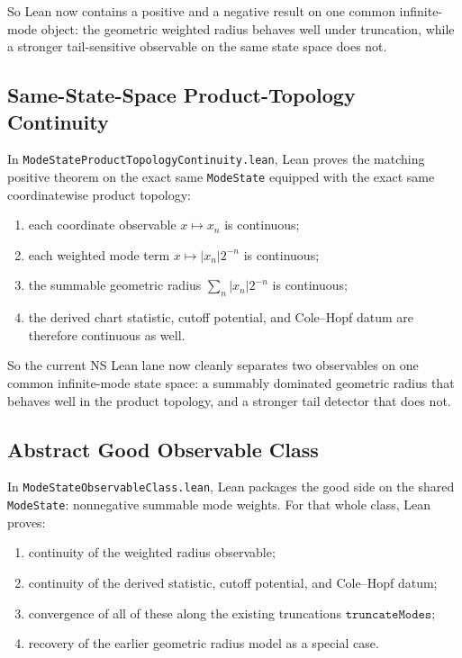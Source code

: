 \documentclass[11pt]{article}
\begin{document}
So Lean now contains a positive and a negative result on one common
infinite-mode object: the geometric weighted radius behaves well under
truncation, while a stronger tail-sensitive observable on the same state space
does not.

\subsection{Same-State-Space Product-Topology Continuity}

In \texttt{ModeStateProductTopologyContinuity.lean}, Lean proves the matching
positive theorem on the exact same \texttt{ModeState} equipped with the exact
same coordinatewise product topology:
\begin{enumerate}[leftmargin=1.5em]
  \item each coordinate observable \(x \mapsto x_n\) is continuous;
  \item each weighted mode term \(x \mapsto |x_n| 2^{-n}\) is continuous;
  \item the summable geometric radius \(\sum_n |x_n| 2^{-n}\) is continuous;
  \item the derived chart statistic, cutoff potential, and Cole--Hopf datum are
  therefore continuous as well.
\end{enumerate}

So the current NS Lean lane now cleanly separates two observables on one common
infinite-mode state space: a summably dominated geometric radius that behaves
well in the product topology, and a stronger tail detector that does not.

\subsection{Abstract Good Observable Class}

In \texttt{ModeStateObservableClass.lean}, Lean packages the good side on the
shared \texttt{ModeState}: nonnegative summable mode weights.  For that whole
class, Lean proves:
\begin{enumerate}[leftmargin=1.5em]
  \item continuity of the weighted radius observable;
  \item continuity of the derived statistic, cutoff potential, and Cole--Hopf
  datum;
  \item convergence of all of these along the existing truncations
  \(\texttt{truncateModes}\);
  \item recovery of the earlier geometric radius model as a special case.
\end{enumerate}
\end{document}
